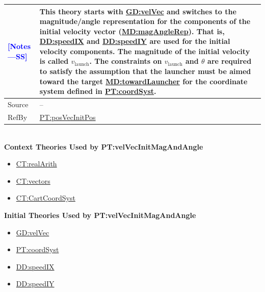 \documentclass[12pt]{article}
\newcommand{\authornote}[3]{\textcolor{#1}{[#3 ---#2]}}
\newcommand{\authornote}[3]{}
\newcommand{\wss}[1]{\authornote{blue}{SS}{#1}}
\begin{document}
\begin{minipage}{\textwidth}
\begin{tabular}{>{\raggedright}p{}>{\raggedright\arraybackslash}p{}}
\\ \midrule \wss{Notes} & This theory starts with
\hyperref[GD:velVec]{GD:velVec} and switches to the magnitude/angle
representation for the components of the initial velocity vector
(\hyperref[MD:magAngleRep]{MD:magAngleRep}).  That is,
\hyperref[DD:speedIX]{DD:speedIX} and \hyperref[DD:speedIY]{DD:speedIY} are used
for the initial velocity components. The magnitude of the initial velocity is
called $v_\text{launch}$.  The constraints on $v_\text{launch}$ and $\theta$ are
required to satisfy the assumption that the launcher must be aimed toward the
target \hyperref[MD:towardLauncher]{MD:towardLauncher} for the coordinate system
defined in \hyperref[PT:coordSyst]{PT:coordSyst}.

\\ \midrule
Source & --
         
\\ \midrule
RefBy & \hyperref[PT:posVecInitPos]{PT:posVecInitPos}

\\ \bottomrule
\end{tabular}
\end{minipage}
~\\

\noindent \textbf{Context Theories Used by PT:velVecInitMagAndAngle}

\begin{itemize}
\item \hyperref[CT:realArith]{CT:realArith}
\item \hyperref[CT:vectors]{CT:vectors}
\item \hyperref[CT:CartCoordSyst]{CT:CartCoordSyst}
\end{itemize}

\noindent \textbf{Initial Theories Used by PT:velVecInitMagAndAngle}

\begin{itemize}
\item \hyperref[GD:velVec]{GD:velVec}
\item \hyperref[PT:coordSyst]{PT:coordSyst}
\item \hyperref[DD:speedIX]{DD:speedIX}
\item \hyperref[DD:speedIY]{DD:speedIY}
\end{itemize}
\end{document}
